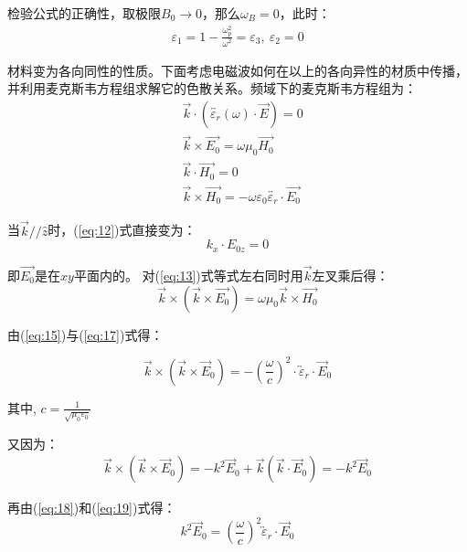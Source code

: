 \documentclass[12pt]{ctexart}
\numberwithin{equation}{section} %
\begin{document}
检验公式的正确性，取极限$B_{0}\to0$，那么$\omega_{B}=0$，此时：
\begin{equation*}
    \begin{aligned}
            \varepsilon_{1}=1-\frac{\omega_{p}^{2}}{\omega^{2}}=\varepsilon_{3} ,\
            \varepsilon_{2}=0
    \end{aligned}
\end{equation*}
\par 材料变为各向同性的性质。下面考虑电磁波如何在以上的各向异性的材质中传播，并利用麦克斯韦方程组求解它的色散关系。频域下的麦克斯韦方程组为：
\begin{align}
    &\overrightarrow{k}\cdot\left(\overleftrightarrow{{\varepsilon}_{r}}\left({\omega}\right)\cdot\overrightarrow{E}\right)=0 \label{eq:12} \\
    &\overrightarrow{k}\times\overrightarrow{E_{0}}=\omega\mu_{0}\overrightarrow{H_{0}} \label{eq:13} \\
    &\overrightarrow{k}\cdot\overrightarrow{H_{0}}=0 \label{eq:14} \\
    &\overrightarrow{k}\times\overrightarrow{H_{0}}=-\omega\varepsilon_{0}\overleftrightarrow{{\varepsilon_{r}}}\cdot\overrightarrow{E_{0}} \label{eq:15}
\end{align}

当$\overrightarrow{k}//\widehat{z}$时，(\ref{eq:12})式直接变为：
\begin{equation}
    k_{x}\cdot E_{0z}=0
    \label{eq:16}
\end{equation}
\par 即$\overrightarrow{E_0}$是在$xy$平面内的。
对(\ref{eq:13})式等式左右同时用$\overrightarrow{k}$左叉乘后得：
\begin{equation}
\overrightarrow{k}\times\left(\overrightarrow{k}\times\overrightarrow{E_{0}}\right)=\omega\mu_{0}\overrightarrow{k}\times\overrightarrow{H_{0}}\label{eq:17}
\end{equation}
\par 由(\ref{eq:15})与(\ref{eq:17})式得：


\begin{equation}
\overrightarrow{k}\times\left(\overrightarrow{k}\times\overrightarrow{E}_{0}\right)=-\left(\frac{\omega}{c}\right)^{2}\cdot\overleftrightarrow{\varepsilon}_{r}\cdot\overrightarrow{E}_{0}
\label{eq:18}
\end{equation}
\par 其中,
$c=\frac1{\sqrt{\mu_{0}\varepsilon_{0}}}
$
\par 又因为：
\begin{align}
\overrightarrow{k}\times\left(\overrightarrow{k}\times\overrightarrow{E}_{0}\right)=-k^{2}\overrightarrow{E}_{0}+\overrightarrow{k}\left(\overrightarrow{k}\cdot\overrightarrow{E}_{0}\right)=-k^{2}\overrightarrow{E}_{0}
\label{eq:19}
\end{align}
\par 再由(\ref{eq:18})和(\ref{eq:19})式得：
\begin{equation}
k^{2}\overrightarrow{E}_{0}=\left(\frac{\omega}{c}\right)^{2}\overleftrightarrow{\varepsilon}_{r}\cdot\overrightarrow{E}_{0}
\label{eq:20}
\end{equation}
\end{document}
